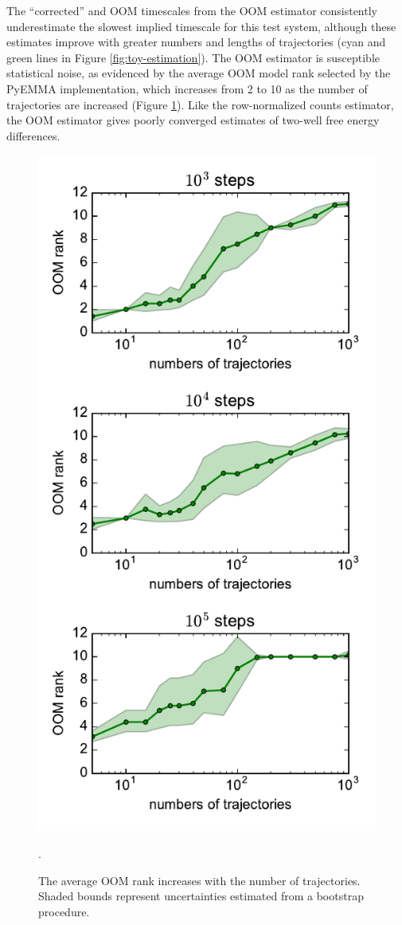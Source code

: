 \documentclass[%
 aip,
rsi,%
 amsmath,amssymb,
 reprint,%
]{revtex4-1}
\begin{document}
The ``corrected'' and OOM timescales from the OOM estimator consistently underestimate the slowest implied timescale for this test system, although these estimates improve with greater numbers and lengths of trajectories (cyan and green lines in Figure \ref{fig:toy-estimation}).  The OOM estimator is susceptible statistical noise, as evidenced by the average OOM model rank selected by the PyEMMA implementation, which increases from 2 to 10 as the number of trajectories are increased (Figure \ref{fig:rankM}).  Like the row-normalized counts estimator, the OOM estimator gives poorly converged estimates of two-well free energy differences.

\begin{figure}[ht!]
    \includegraphics[width=0.85\columnwidth]{figures/rankM_oct2018.pdf}
    \caption{The average OOM rank increases with the number of trajectories.  Shaded bounds represent uncertainties estimated from a bootstrap procedure.}.
    \label{fig:rankM}
\end{figure}
\end{document}
